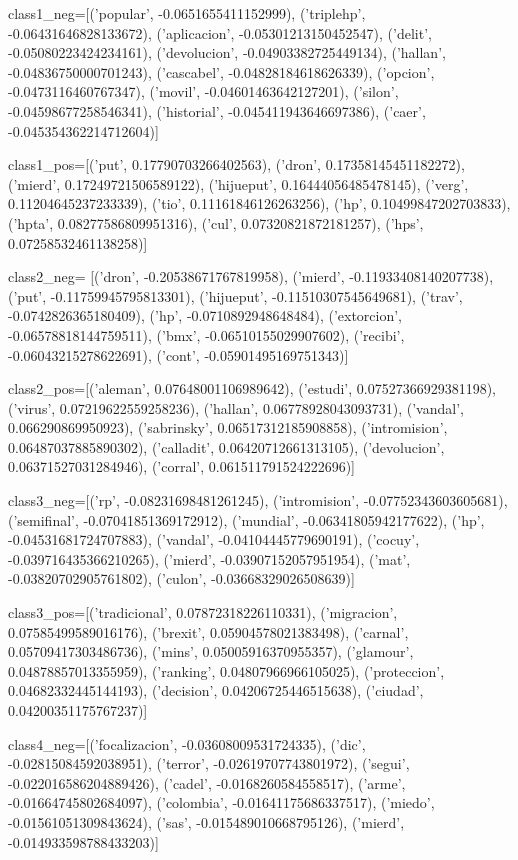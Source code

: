 class1_neg=[('popular', -0.0651655411152999),
 ('triplehp', -0.06431646828133672),
 ('aplicacion', -0.05301213150452547),
 ('delit', -0.05080223424234161),
 ('devolucion', -0.04903382725449134),
 ('hallan', -0.04836750000701243),
 ('cascabel', -0.04828184618626339),
 ('opcion', -0.0473116460767347),
 ('movil', -0.04601463642127201),
 ('silon', -0.04598677258546341),
 ('historial', -0.045411943646697386),
 ('caer', -0.045354362214712604)]
 
 class1_pos=[('put', 0.17790703266402563),
 ('dron', 0.17358145451182272),
 ('mierd', 0.17249721506589122),
 ('hijueput', 0.16444056485478145),
 ('verg', 0.11204645237233339),
 ('tio', 0.11161846126263256),
 ('hp', 0.10499847202703833),
 ('hpta', 0.08277586809951316),
 ('cul', 0.07320821872181257),
 ('hps', 0.07258532461138258)]
 
 class2_neg= [('dron', -0.20538671767819958),
 ('mierd', -0.11933408140207738),
 ('put', -0.11759945795813301),
 ('hijueput', -0.11510307545649681),
 ('trav', -0.0742826365180409),
 ('hp', -0.0710892948648484),
 ('extorcion', -0.06578818144759511),
 ('bmx', -0.06510155029907602),
 ('recibi', -0.06043215278622691),
 ('cont', -0.05901495169751343)]
 
 class2_pos=[('aleman', 0.07648001106989642),
 ('estudi', 0.07527366929381198),
 ('virus', 0.07219622559258236),
 ('hallan', 0.06778928043093731),
 ('vandal', 0.066290869950923),
 ('sabrinsky', 0.06517312185908858),
 ('intromision', 0.06487037885890302),
 ('calladit', 0.06420712661313105),
 ('devolucion', 0.06371527031284946),
 ('corral', 0.061511791524222696)]
 
 class3_neg=[('rp', -0.08231698481261245),
 ('intromision', -0.07752343603605681),
 ('semifinal', -0.07041851369172912),
 ('mundial', -0.06341805942177622),
 ('hp', -0.04531681724707883),
 ('vandal', -0.04104445779690191),
 ('cocuy', -0.039716435366210265),
 ('mierd', -0.03907152057951954),
 ('mat', -0.03820702905761802),
 ('culon', -0.03668329026508639)]
 
 class3_pos=[('tradicional', 0.07872318226110331),
 ('migracion', 0.07585499589016176),
 ('brexit', 0.05904578021383498),
 ('carnal', 0.05709417303486736),
 ('mins', 0.05005916370955357),
 ('glamour', 0.04878857013355959),
 ('ranking', 0.04807966966105025),
 ('proteccion', 0.04682332445144193),
 ('decision', 0.04206725446515638),
 ('ciudad', 0.04200351175767237)]
 
 class4_neg=[('focalizacion', -0.03608009531724335),
 ('dic', -0.02815084592038951),
 ('terror', -0.02619707743801972),
 ('segui', -0.022016586204889426),
 ('cadel', -0.0168260584558517),
 ('arme', -0.01664745802684097),
 ('colombia', -0.01641175686337517),
 ('miedo', -0.01561051309843624),
 ('sas', -0.015489010668795126),
 ('mierd', -0.014933598788433203)]
 

